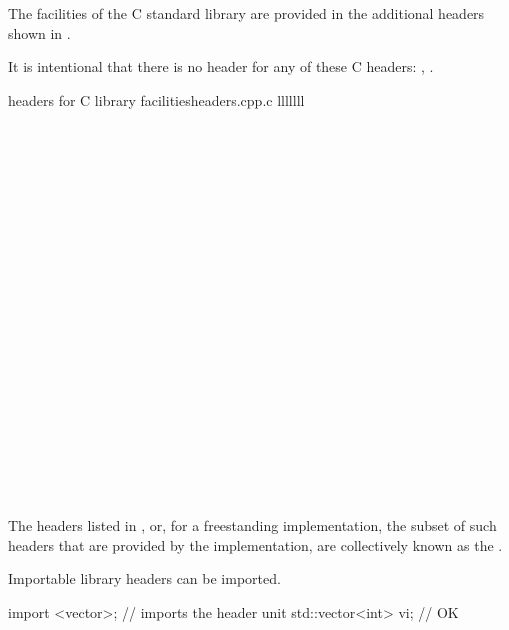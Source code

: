 \pnum
The facilities of the C standard library are provided in the
%
additional headers shown in .%
\begin{footnote}
It is intentional that there is no \Cpp{} header
for any of these C headers:
,
.
\end{footnote}

\begin{multicolfloattable}{\Cpp{} headers for C library facilities}{headers.cpp.c}
{lllllll}
 \\
 \\
 \\
\columnbreak
{} \\
 \\
 \\
\columnbreak
{} \\
 \\
 \\
\columnbreak
{} \\
 \\
 \\
\columnbreak
{} \\
 \\
 \\
\columnbreak
{} \\
 \\
 \\
\columnbreak
{} \\
 \\
 \\
\end{multicolfloattable}

\pnum
The headers listed in , or,
for a freestanding implementation,
the subset of such headers that are provided by the implementation,
are collectively known as
the .
\begin{note}
Importable \Cpp{} library headers can be
imported.
\end{note}
\begin{example}
\begin{codeblock}
import <vector>;                // imports the  header unit
std::vector<int> vi;            // OK
\end{codeblock}
\end{example}


